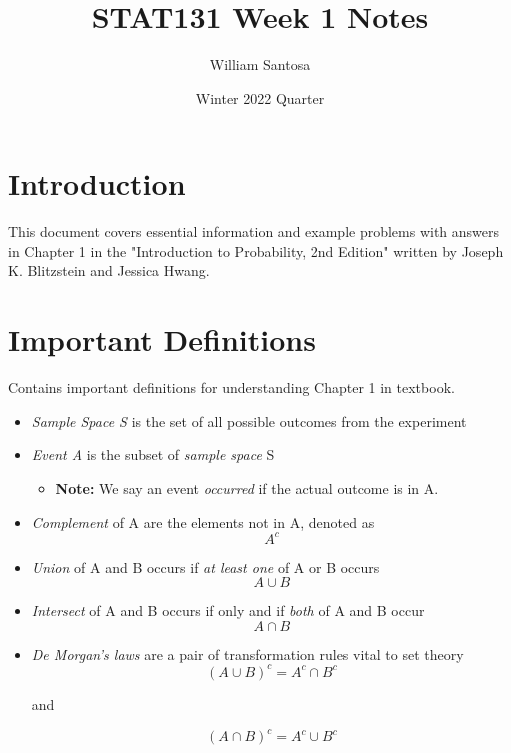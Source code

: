 \documentclass[12pt, letterpaper]{article}
\title{STAT131 Week 1 Notes}
\author{William Santosa}
\date{Winter 2022 Quarter}
\begin{document}
\maketitle

\section{Introduction}
This document covers essential information and example problems with answers in Chapter 1 in the "Introduction to Probability, 2nd Edition" written by Joseph K. Blitzstein and Jessica Hwang.

\section{Important Definitions}

Contains important definitions for understanding Chapter 1 in textbook.

\begin{itemize}
    \item \textit{Sample Space S} is the set of all possible outcomes from the experiment
    \item \textit{Event A} is the subset of \emph{sample space} S
    \begin{itemize}
        \item \textbf{Note:} We say an event \textit{occurred} if the actual outcome is in A.
    \end{itemize}
    \item \textit{Complement} of A are the elements not in A, denoted as \[A^{c}\]
    \item \textit{Union} of A and B occurs if \textit{at least one} of A or B occurs \[A \cup B\]
    \item \textit{Intersect} of A and B occurs if only and if \textit{both} of A and B occur \[A \cap B\]
    \item \textit{De Morgan's laws} are a pair of transformation rules vital to set theory \[(A\cup B)^{c} = A^{c}\cap B^{c}\] \begin{center} and \end{center}\[(A\cap B)^{c} = A^{c}\cup B^{c}\]
\end{itemize}
\end{document}
